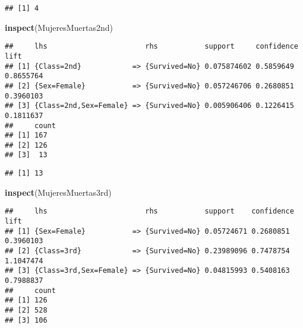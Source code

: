 \documentclass[]{article}
\newenvironment{Shaded}{\begin{snugshade}}{\end{snugshade}}
\newcommand{\DecValTok}[1]{\textcolor[rgb]{0.00,0.00,0.81}{#1}}
\newcommand{\KeywordTok}[1]{\textcolor[rgb]{0.13,0.29,0.53}{\textbf{#1}}}
\newcommand{\NormalTok}[1]{#1}
\newcommand{\OperatorTok}[1]{\textcolor[rgb]{0.81,0.36,0.00}{\textbf{#1}}}
\newcommand{\StringTok}[1]{\textcolor[rgb]{0.31,0.60,0.02}{#1}}
\begin{document}
\begin{Shaded}
\end{Shaded}

\begin{verbatim}
## [1] 4
\end{verbatim}

\begin{Shaded}
\begin{Highlighting}[]
\KeywordTok{inspect}\NormalTok{(MujeresMuertas2nd)}
\end{Highlighting}
\end{Shaded}

\begin{verbatim}
##     lhs                       rhs           support     confidence lift     
## [1] {Class=2nd}            => {Survived=No} 0.075874602 0.5859649  0.8655764
## [2] {Sex=Female}           => {Survived=No} 0.057246706 0.2680851  0.3960103
## [3] {Class=2nd,Sex=Female} => {Survived=No} 0.005906406 0.1226415  0.1811637
##     count
## [1] 167  
## [2] 126  
## [3]  13
\end{verbatim}

\begin{Shaded}
\end{Shaded}

\begin{verbatim}
## [1] 13
\end{verbatim}

\begin{Shaded}
\begin{Highlighting}[]
\KeywordTok{inspect}\NormalTok{(MujeresMuertas3rd)}
\end{Highlighting}
\end{Shaded}

\begin{verbatim}
##     lhs                       rhs           support    confidence lift     
## [1] {Sex=Female}           => {Survived=No} 0.05724671 0.2680851  0.3960103
## [2] {Class=3rd}            => {Survived=No} 0.23989096 0.7478754  1.1047474
## [3] {Class=3rd,Sex=Female} => {Survived=No} 0.04815993 0.5408163  0.7988837
##     count
## [1] 126  
## [2] 528  
## [3] 106
\end{verbatim}
\end{document}
